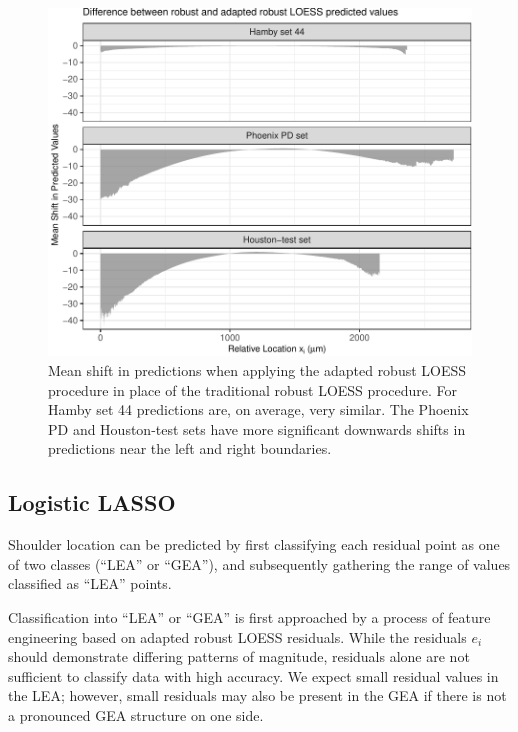 \documentclass[12pt]{article}
\begin{document}
\begin{figure}
\centering
\includegraphics{writeup_files/figure-latex/adapted-rlo-shift-1.pdf}
\caption{\label{adapted-rlo-shift}Mean shift in predictions when
applying the adapted robust LOESS procedure in place of the traditional
robust LOESS procedure. For Hamby set 44 predictions are, on average,
very similar. The Phoenix PD and Houston-test sets have more significant
downwards shifts in predictions near the left and right boundaries.}
\end{figure}

\subsection{Logistic LASSO}

{\color{purple}{This next section is hard to follow:}}

Shoulder location can be predicted by first classifying each residual
point as one of two classes (``LEA'' or ``GEA''), and subsequently
gathering the range of values classified as ``LEA'' points.

Classification into ``LEA'' or ``GEA'' is first approached by a process
of feature engineering based on adapted robust LOESS residuals. While
the residuals \(e_i\) should demonstrate differing patterns of
magnitude, residuals alone are not sufficient to classify data with high
accuracy. We expect small residual values in the LEA; however, small
residuals may also be present in the GEA if there is not a pronounced
GEA structure on one side.
\end{document}
